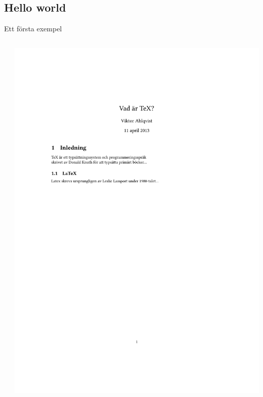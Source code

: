 \documentclass[xcolor=x11names,compress,swedish]{beamer}
\begin{document}
	\subsection{Hello world}
		\begin{frame}[fragile]{Ett första exempel}
			\begin{columns}
				\begin{column}{0.5\textwidth}
						
				\end{column}
				\begin{column}{0.5\textwidth}
					\includegraphics[trim=5cm 5cm 5cm 5cm, width=\textwidth]{examples/example1.pdf}
				\end{column}
			\end{columns}
		\end{frame}
			
\end{document}
